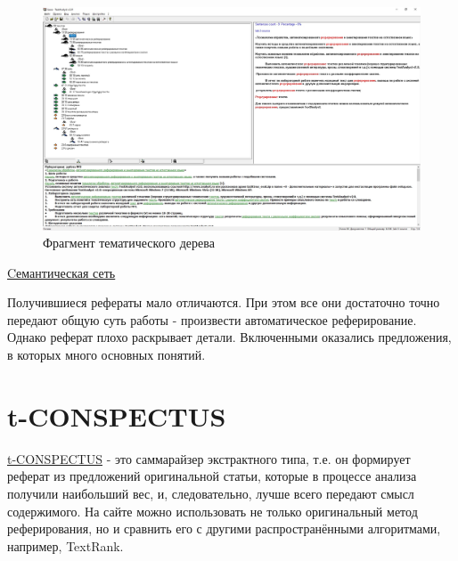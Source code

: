	
		
		\begin{figure}[h]
			\centering
			\includegraphics[width=0.7\linewidth]{images/lab-3-theme-tree}
			\caption{Фрагмент тематического дерева}
			\label{fig:lab-3-theme-tree}
		\end{figure}

		\begin{table} [htbp]
			\centering
			\caption{Результаты автоматического реферирования текста задания}
			\label{table:lab}%
		\end{table}
	
	\href{./listings/lab-3.html}{Cемантическая сеть}
	
	Получившиеся рефераты мало отличаются.
	При этом все они достаточно точно передают общую суть работы - произвести автоматическое реферирование.
	Однако реферат плохо раскрывает детали.
	Включенными оказались предложения, в которых много основных понятий.
	
	\section{t-CONSPECTUS}
	\href{http://tconspectus.pythonanywhere.com/summarization}{t-CONSPECTUS} - это саммарайзер экстрактного типа, т.е. он формирует реферат из предложений оригинальной статьи, которые в процессе анализа получили наибольший вес, и, следовательно, лучше всего передают смысл содержимого. На сайте можно использовать не только оригинальный метод реферирования, но и сравнить его с другими распространёнными алгоритмами, например, TextRank.
	
